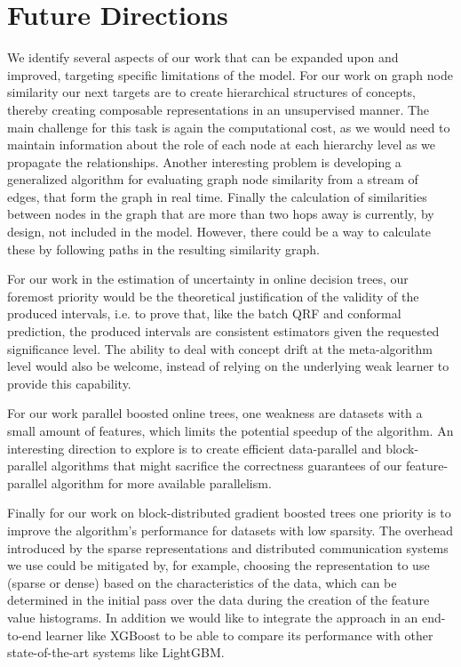 \section{Future Directions}

We identify several aspects of our work that can be expanded upon and improved,
targeting specific limitations of the model. For our work on graph node similarity
our next targets are to create hierarchical structures of concepts, thereby creating
composable representations in an unsupervised manner. The main challenge for this
task is again the computational cost, as we would need to maintain information
about the role of each node at each hierarchy level as we propagate the relationships.
Another interesting problem is developing
a generalized algorithm for evaluating graph node similarity from a stream of edges,
that form the graph in real time. Finally the calculation of similarities between
nodes in the graph that are more than two hops away is currently, by design, not included
in the model. However, there could be a way to calculate these by following paths in
the resulting similarity graph.

For our work in the estimation of uncertainty in online decision trees, our foremost
priority would be the theoretical justification of the validity of the produced intervals,
i.e. to prove that, like the batch QRF and conformal prediction, the produced intervals
are consistent estimators given the requested significance level. The ability to
deal with concept drift at the meta-algorithm level would also be welcome, instead
of relying on the underlying weak learner to provide this capability.

For our work parallel boosted online trees, one weakness are datasets with
a small amount of features, which limits the potential speedup of the
algorithm.
An interesting direction to explore is to
create efficient data-parallel and block-parallel algorithms that might sacrifice
the correctness guarantees of our feature-parallel algorithm for more available
parallelism.

Finally for our work on block-distributed gradient boosted trees one priority is to
improve the algorithm's performance for datasets with low sparsity. The overhead
introduced by the sparse representations and distributed communication systems we use could be mitigated by,
for example, choosing the representation to use (sparse or dense) based on the
characteristics of the data, which can be determined in the initial pass over the
data during the creation of the feature value histograms. In addition we would
like to integrate the approach in an end-to-end learner like XGBoost to be able
to compare its performance with other state-of-the-art systems like LightGBM.
